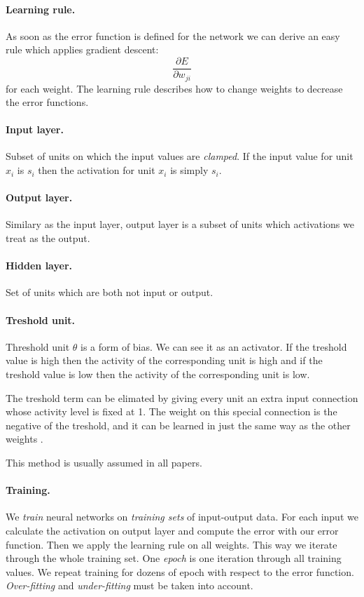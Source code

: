 \paragraph{Learning rule.}
As soon as the error function is defined for the network we can derive an easy rule which applies gradient descent: 
$$\frac{\partial E}{\partial w_{ji}}$$
for each weight. The learning rule describes how to change weights to decrease the error functions.

\paragraph{Input layer.}
Subset of units on which the input values are \emph{clamped}. If the input value for unit $x_i$ is $s_i$ then the activation for unit $x_i$ is simply $s_i$. 

\paragraph{Output layer.}
Similary as the input layer, output layer is a subset of units which activations we treat as the output. 

\paragraph{Hidden layer.}
Set of units which are both not input or output. 

\paragraph{Treshold unit.}
Threshold unit $\theta$ is a form of bias. We can see it as an activator. If the treshold value is high then the activity of the corresponding unit is high and if the treshold value is low then the activity of the corresponding unit is low. 

The treshold term can be elimated by giving every unit an extra input connection whose activity level is fixed at 1. The weight on this special connection is the negative of the treshold, and it can be learned in just the same way as the other weights  \citet{hinton1988learning}.

This method is usually assumed in all papers. 

\paragraph{Training.}
We \emph{train} neural networks on \emph{training sets} of input-output data. For each input we calculate the activation on output layer and compute the error with our error function. Then we apply the learning rule on all weights. This way we iterate through the whole training set. One \emph{epoch} is one iteration through all training values. We repeat training for dozens of epoch with respect to the error function. \emph{Over-fitting} and \emph{under-fitting} must be taken into account.   

